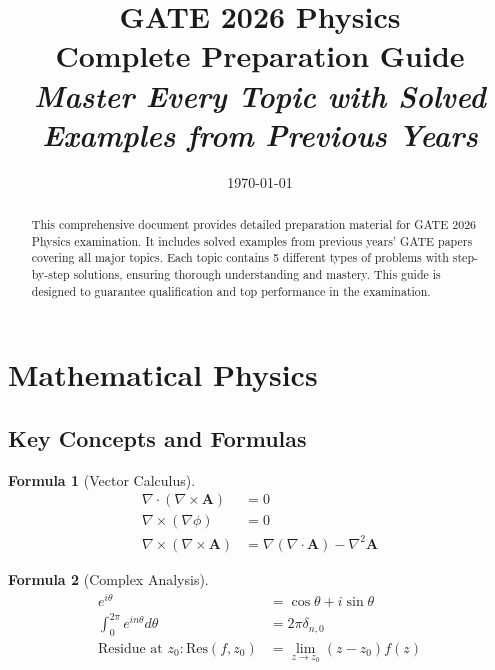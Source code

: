\documentclass[12pt,a4paper]{article}
\newtheorem{formula}{Formula}[section]
\begin{document}
\title{
    \vspace{-2cm}
    \Huge\textbf{GATE 2026 Physics}\\
    \Large\textbf{Complete Preparation Guide}\\
    \large\textit{Master Every Topic with Solved Examples from Previous Years}
    \vspace{0.5cm}
}
\author{}
\date{\today}
\maketitle

\begin{abstract}
    \noindent This comprehensive document provides detailed preparation material for GATE 2026 Physics examination. It includes solved examples from previous years' GATE papers covering all major topics. Each topic contains 5 different types of problems with step-by-step solutions, ensuring thorough understanding and mastery. This guide is designed to guarantee qualification and top performance in the examination.
\end{abstract}

\tableofcontents
\newpage

\section{Mathematical Physics}

\subsection{Key Concepts and Formulas}

\begin{formula}[Vector Calculus]
\begin{align}
\nabla \cdot (\nabla \times \mathbf{A}) &= 0\\
\nabla \times (\nabla \phi) &= 0\\
\nabla \times (\nabla \times \mathbf{A}) &= \nabla(\nabla \cdot \mathbf{A}) - \nabla^2 \mathbf{A}
\end{align}
\end{formula}

\begin{formula}[Complex Analysis]
\begin{align}
e^{i\theta} &= \cos\theta + i\sin\theta\\
\int_0^{2\pi} e^{in\theta} d\theta &= 2\pi \delta_{n,0}\\
\text{Residue at } z_0: \text{Res}(f,z_0) &= \lim_{z \to z_0} (z-z_0)f(z)
\end{align}
\end{formula}
\end{document}
